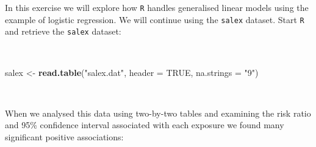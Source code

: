 \documentclass[12pt,a4paper]{book}
\newenvironment{Shaded}{\begin{snugshade}}{\end{snugshade}}
\newcommand{\KeywordTok}[1]{\textcolor[rgb]{0.13,0.29,0.53}{\textbf{#1}}}
\newcommand{\DataTypeTok}[1]{\textcolor[rgb]{0.13,0.29,0.53}{#1}}
\newcommand{\StringTok}[1]{\textcolor[rgb]{0.31,0.60,0.02}{#1}}
\newcommand{\OtherTok}[1]{\textcolor[rgb]{0.56,0.35,0.01}{#1}}
\newcommand{\NormalTok}[1]{#1}
\theoremstyle{definition}
\theoremstyle{definition}
\theoremstyle{definition}
\theoremstyle{remark}
\begin{document}
In this exercise we will explore how \texttt{R} handles generalised
linear models using the example of logistic regression. We will continue
using the \texttt{salex} dataset. Start \texttt{R} and retrieve the
\texttt{salex} dataset:

~

\begin{Shaded}
\begin{Highlighting}[]
\NormalTok{salex <-}\StringTok{ }\KeywordTok{read.table}\NormalTok{(}\StringTok{"salex.dat"}\NormalTok{, }\DataTypeTok{header =} \OtherTok{TRUE}\NormalTok{, }\DataTypeTok{na.strings =} \StringTok{"9"}\NormalTok{)}
\end{Highlighting}
\end{Shaded}

~

When we analysed this data using two-by-two tables and examining the
risk ratio and 95\% confidence interval associated with each exposure we
found many significant positive associations:

~
\end{document}
